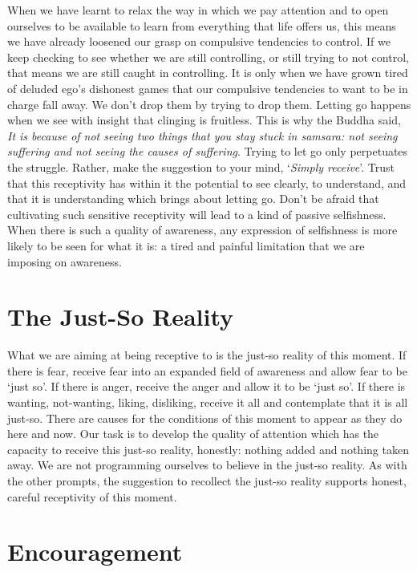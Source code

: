 When we have learnt to relax the way in which we pay attention and to
open ourselves to be available to learn from everything that life offers
us, this means we have already loosened our grasp on compulsive
tendencies to control. If we keep checking to see whether we are still
controlling, or still trying to not control, that means we are still
caught in controlling. It is only when we have grown tired of deluded
ego's dishonest games that our compulsive tendencies to want to be in
charge fall away. We don't drop them by trying to drop them. Letting go
happens when we see with insight that clinging is fruitless. This is why
the Buddha said, \emph{It is because of not seeing two things that you
stay stuck in samsara: not seeing suffering and not seeing the causes of
suffering}. Trying to let go only perpetuates the struggle. Rather, make
the suggestion to your mind, `\emph{Simply receive}'. Trust that this
receptivity has within it the potential to see clearly, to understand,
and that it is understanding which brings about letting go. Don't be
afraid that cultivating such sensitive receptivity will lead to a kind
of passive selfishness. When there is such a quality of awareness, any
expression of selfishness is more likely to be seen for what it is: a
tired and painful limitation that we are imposing on awareness.

\section{The Just-So Reality}

What we are aiming at being receptive to is the just-so reality of this moment.
If there is fear, receive fear into an expanded field of awareness and
allow fear to be `just so'. If there is anger, receive the anger and
allow it to be `just so'. If there is wanting, not-wanting, liking,
disliking, receive it all and contemplate that it is all just-so. There are
causes for the conditions of this moment to appear as they do here and
now. Our task is to develop the quality of attention which has the capacity to
receive this just-so reality, honestly: nothing added and nothing taken
away. We are not programming ourselves to believe in the just-so
reality. As with the other prompts, the suggestion to recollect the
just-so reality supports honest, careful receptivity of this moment.

\sectionBreak

\section{Encouragement}

